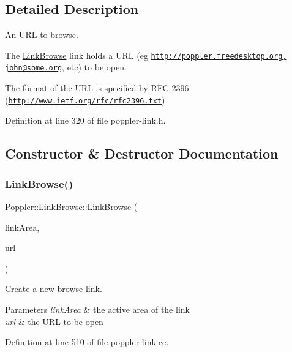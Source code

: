 \subsection{Detailed Description}
An U\+RL to browse. 

The \hyperlink{class_poppler_1_1_link_browse}{Link\+Browse} link holds a U\+RL (eg \textquotesingle{}\href{http://poppler.freedesktop.org',}{\tt http\+://poppler.\+freedesktop.\+org\textquotesingle{},} \textquotesingle{}\href{mailto:john@some.org}{\tt john@some.\+org}\textquotesingle{}, etc) to be open.

The format of the U\+RL is specified by R\+FC 2396 (\href{http://www.ietf.org/rfc/rfc2396.txt}{\tt http\+://www.\+ietf.\+org/rfc/rfc2396.\+txt}) 

Definition at line 320 of file poppler-\/link.\+h.



\subsection{Constructor \& Destructor Documentation}
\mbox{\label{class_poppler_1_1_link_browse_ac468b602d409ba7a9ae3257ced3e5666}} 
\subsubsection{\texorpdfstring{Link\+Browse()}{LinkBrowse()}}
{\footnotesize\ttfamily Poppler\+::\+Link\+Browse\+::\+Link\+Browse (\begin{DoxyParamCaption}\item[{const Q\+RectF \&}]{link\+Area,  }\item[{const Q\+String \&}]{url }\end{DoxyParamCaption})}

Create a new browse link.


\begin{DoxyParams}{Parameters}
{\em link\+Area} & the active area of the link \\
\hline
{\em url} & the U\+RL to be open \\
\hline
\end{DoxyParams}


Definition at line 510 of file poppler-\/link.\+cc.

\mbox{\label{class_poppler_1_1_link_browse_ad67e29fea777807de9baa47132b5ad15}} 
